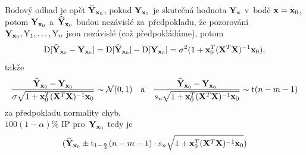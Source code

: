 Bodový odhad je opět $\widehat{\Y}_{\x_0}$, pokud $\Y_{\x_0}$ je skutečná hodnota $\Y_{\x}$ v~bodě $\x = \x_0$, potom $\Y_{\x_0}$ a~$\widehat{\Y}_{\x_0}$ budou nezávislé za~předpokladu, že pozorování $\Y_{\x_0}, \text{Y}_1,\dots, \text{Y}_n$ jsou nezávislé (což předpokládáme),
potom
 $$
\D [\widehat{\Y}_{\x_0} - \Y_{\x_0}] = \D [\widehat{\Y}_{\x_0}] - \D [\Y_{\x_0}] = \sigma^2(1+ \x_0^T(\X^T \X)^{-1} \x_0),
 $$
takže
 $$
\frac{\widehat{\Y}_{\x_0} - \Y_{\x_0}}{\sigma \sqrt{1+ \x_0^T(\X^T \X)^{-1} \x_0 }} \sim \NN(0,1) \quad \text{a} \quad \frac{\widehat{\Y}_{\x_0} - \Y_{\x_0}}{s_n \sqrt{1+ \x_0^T(\X^T \X)^{-1} \x_0 }} \sim \mathrm{t}(n-m-1)
 $$
za předpokladu normality chyb. \\
 $100(1-\alpha) \%$ IP pro~$\Y_{\x_0}$ tedy je
 $$
 (\widehat{\Y}_{\x_0} \pm \mathrm{t}_{1 - \frac{\alpha}{2}}(n-m-1) \cdot s_n \sqrt{1+ \x_0^T(\X^T \X)^{-1} \x_0 })
 $$
